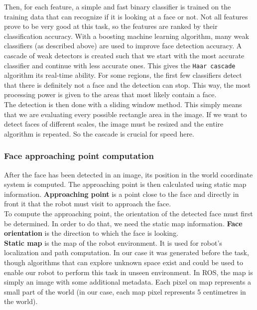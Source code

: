 \documentclass[12pt,a4paper]{article}
\begin{document}
	Then, for each feature, a simple and fast binary classifier is trained on the training data that can recognize if it is looking at a face or not. Not all features prove to be very good at this task, so the features are ranked by their classification accuracy. With a boosting machine learning algorithm, many weak classifiers (as described above) are used to improve face detection accuracy. A cascade of weak detectors is created such that we start with the most accurate classifier and continue with less accurate ones. This gives the \texttt{Haar cascade} algorithm its real-time ability. For some regions, the first few classifiers detect that there is definitely not a face and the detection can stop. This way, the most processing power is given to the areas that most likely contain a face. \\
	
	The detection is then done with a sliding window method. This simply means that we are evaluating every possible rectangle area in the image. If we want to detect faces of different scales, the image must be resized and the entire algorithm is repeated. So the cascade is crucial for speed here. \\
	
	\subsubsection{Face approaching point computation} \label{face_approaching_points}
	After the face has been detected in an image, its position in the world coordinate system is computed. The approaching point is then calculated using static map information. \textbf{Approaching point} is a point close to the face and directly in front it that the robot must visit to approach the face. \\
	
	To compute the approaching point, the orientation of the detected face must first be determined. In order to do that, we need the static map information. \textbf{Face orientation} is the direction to which the face is looking. \\
	
	\textbf{Static map} is the map of the robot environment. It is used for robot's localization and path computation. In our case it was generated before the task, though algorithms that can explore unknown space exist and could be used to enable our robot to perform this task in unseen environment. In ROS, the map is simply an image with some additional metadata. Each pixel on map represents a small part of the world (in our case, each map pixel represents 5 centimetres in the world).\\
	
\end{document}
